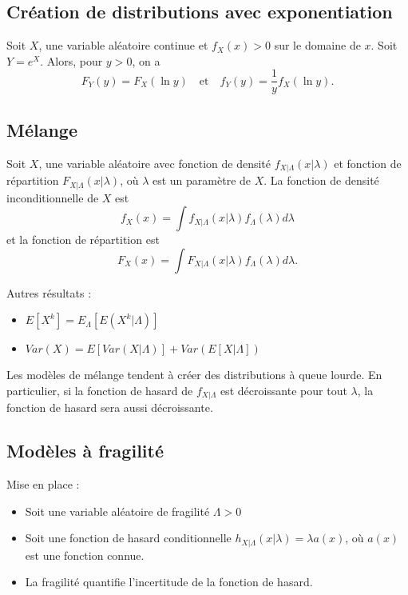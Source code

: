 \subsection{Création de distributions avec exponentiation}

\begin{theoreme}{}{}
	Soit $X$, une variable aléatoire continue et $f_{X}(x) > 0$ sur le domaine de $x$. Soit $Y = e^X$. Alors, pour $y>0$, on a 
	$$F_{Y}(y) = F_{X}(\ln y) \quad \text{et} \quad f_{Y}(y) = \frac{1}{y}f_{X}(\ln y).$$
\end{theoreme}

\subsection{Mélange}

\begin{theoreme}{}{}
	Soit $X$, une variable aléatoire avec fonction de densité $f_{X\vert \Lambda}(x\vert \lambda)$ et fonction de répartition $F_{X\vert \Lambda}(x\vert \lambda)$, où $\lambda$ est un paramètre de $X$. La fonction de densité inconditionnelle de $X$ est 
	$$f_{X}(x) = \int f_{X\vert\Lambda}(x\vert \lambda) f_{\Lambda}(\lambda) d\lambda$$
	et la fonction de répartition est 
	$$F_{X}(x) = \int F_{X\vert \Lambda}(x\vert\lambda) f_{\Lambda}(\lambda) d\lambda.$$
\end{theoreme}

Autres résultats :
\begin{itemize}
	\item $\displaystyle E\left[X^k\right] = E_{\Lambda}\left[E\left(X^k \vert \Lambda\right)\right]$
	\item $\displaystyle Var(X) = E\left[Var(X \vert \Lambda)\right] + Var\left(E\left[X \vert \Lambda\right]\right)$
\end{itemize}

Les modèles de mélange tendent à créer des distributions à queue lourde. En particulier, si la fonction de hasard de $f_{X\vert\Lambda}$ est décroissante pour tout $\lambda$, la fonction de hasard sera aussi décroissante. 

\subsection{Modèles à fragilité}

Mise en place : 

\begin{itemize}
	\item Soit une variable aléatoire de fragilité $\Lambda>0$
	\item Soit une fonction de hasard conditionnelle $h_{X\vert \Lambda}(x\vert\lambda) = \lambda a(x)$, où $a(x)$ est une fonction connue. 
	\item La fragilité quantifie l'incertitude de la fonction de hasard.  
\end{itemize}


